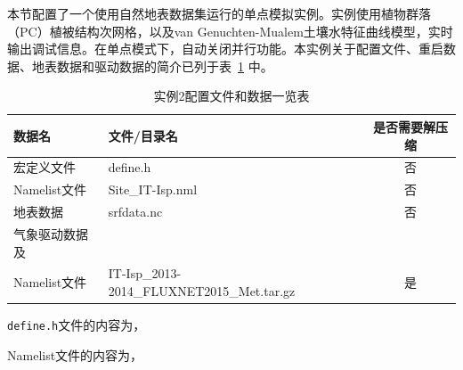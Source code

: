本节配置了一个使用自然地表数据集运行的单点模拟实例。实例使用植物群落（PC）植被结构次网格，以及van Genuchten-Mualem土壤水特征曲线模型，实时输出调试信息。在单点模式下，自动关闭并行功能。本实例关于配置文件、重启数据、地表数据和驱动数据的简介已列于表~\ref{ex2table} 中。


\begin{table}[htbp]
\caption{实例2配置文件和数据一览表}
\centering \renewcommand{\arraystretch}{1.5}
\label{ex2table}
\begin{tabular}{llc}
\toprule
\textbf{数据名} & \textbf{文件/目录名} & \textbf{是否需要解压缩} \\

\midrule

宏定义文件 & define.h & 否 \\
Namelist文件 & Site\_IT-Isp.nml & 否 \\
地表数据 & srfdata.nc & 否 \\
气象驱动数据及\\Namelist文件 & IT-Isp\_2013-2014\_FLUXNET2015\_Met.tar.gz & 是 \\

\bottomrule
\end{tabular}
\end{table}

\texttt{define.h}文件的内容为，


Namelist文件的内容为，


